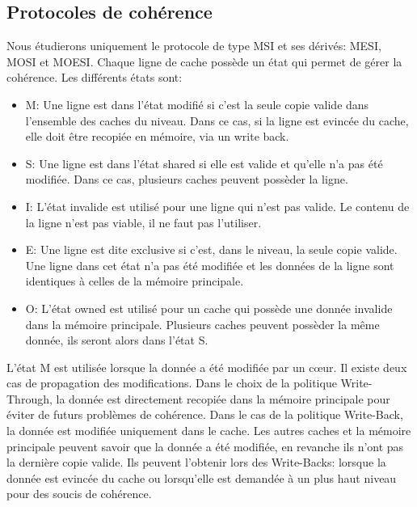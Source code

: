 \documentclass[a4paper]{article}
\begin{document}
\subsection{Protocoles de cohérence}
\indent Nous étudierons uniquement le protocole de type MSI et ses dérivés: MESI, MOSI et MOESI. Chaque ligne de cache possède un état qui permet de gérer la cohérence. Les différents états sont: \\
\begin{itemize}
\item M: Une ligne est dans l'état modifié si c'est la seule copie valide dans l'ensemble des caches du niveau. Dans ce cas, si la ligne est evincée du cache, elle doit être recopiée en mémoire, via un write back. \\
\item S: Une ligne est dans l'état shared si elle est valide et qu'elle n'a pas été modifiée. Dans ce cas, plusieurs caches peuvent possèder la ligne. \\
\item I: L'état invalide est utilisé pour une ligne qui n'est pas valide. Le contenu de la ligne n'est pas viable, il ne faut pas l'utiliser. \\
\item E: Une ligne est dite exclusive si c'est, dans le niveau, la seule copie valide. Une ligne dans cet état n'a pas été modifiée et les données de la ligne sont identiques à celles de la mémoire principale. \\
\item O: L'état owned est utilisé pour un cache qui possède une donnée invalide dans la mémoire principale. Plusieurs caches peuvent possèder la même donnée, ils seront alors dans l'état S. \\
\end{itemize}

\indent L'état M est utilisée lorsque la donnée a été modifiée par un c{\oe}ur. Il existe deux cas de propagation des modifications. Dans le choix de la politique Write-Through, la donnée est directement recopiée dans la mémoire principale pour éviter de futurs problèmes de cohérence. Dans le cas de la politique Write-Back, la donnée est modifiée uniquement dans le cache. Les autres caches et la mémoire principale peuvent savoir que la donnée a été modifiée, en revanche ils n'ont pas la dernière copie valide. Ils peuvent l'obtenir lors des Write-Backs: lorsque la donnée est evincée du cache ou lorsqu'elle est demandée à un plus haut niveau pour des soucis de cohérence.
\end{document}
